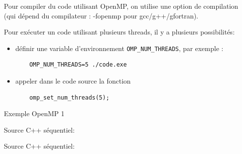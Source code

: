 \documentclass{beamer}
\begin{document}
\begin{frame}[fragile]

Pour compiler du code utilisant OpenMP, on utilise une option de compilation (qui dépend du compilateur : -fopenmp pour gcc/g++/gfortran).

\vfill
Pour exécuter un code utilisant plusieurs threads, il y a plusieurs possibilités:
\begin{itemize}
	\item définir une variable d'environnement \verb|OMP_NUM_THREADS|, par exemple :
	\begin{lstlisting}
	OMP_NUM_THREADS=5 ./code.exe
	\end{lstlisting}
	\item appeler dans le code source la fonction
	\begin{lstlisting}
	omp_set_num_threads(5);
	\end{lstlisting}
\end{itemize}
\vfill
\end{frame}

\begin{frame}
	Exemple OpenMP 1
\end{frame}


\begin{frame}[fragile]
	Source C++ séquentiel:
	\vfill
{
	\normalsize
		
}
\end{frame}

\begin{frame}[fragile]
	Source C++ séquentiel:
	\vfill
	{
		\normalsize
			
	}
\end{frame}
\end{document}
